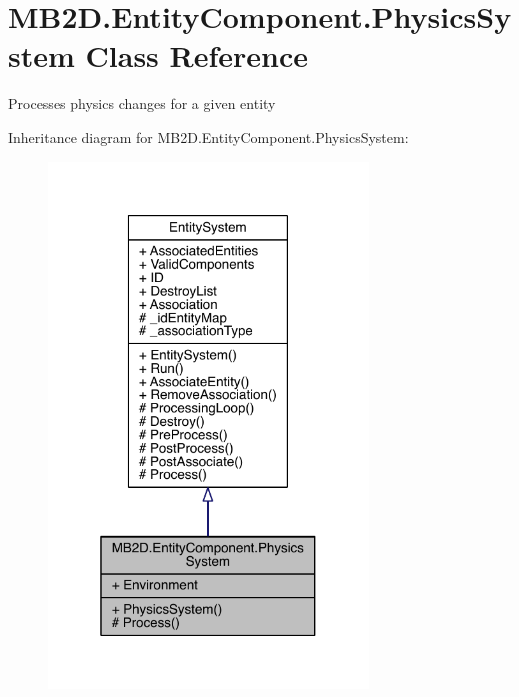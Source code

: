 \hypertarget{class_m_b2_d_1_1_entity_component_1_1_physics_system}{}\section{M\+B2\+D.\+Entity\+Component.\+Physics\+System Class Reference}
\label{class_m_b2_d_1_1_entity_component_1_1_physics_system}


Processes physics changes for a given entity  




Inheritance diagram for M\+B2\+D.\+Entity\+Component.\+Physics\+System\+:\nopagebreak
\begin{figure}[H]
\begin{center}
\leavevmode
\includegraphics[width=241pt]{class_m_b2_d_1_1_entity_component_1_1_physics_system__inherit__graph}
\end{center}
\end{figure}


